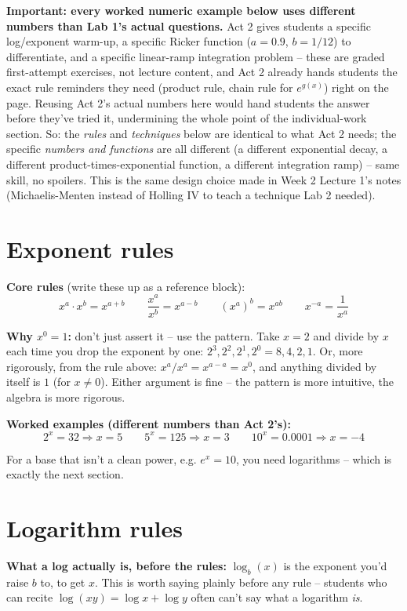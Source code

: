 \documentclass[12pt,]{article}
\begin{document}
\textbf{Important: every worked numeric example below uses different
numbers than Lab 1's actual questions.} Act 2 gives students a specific
log/exponent warm-up, a specific Ricker function (\(a=0.9\), \(b=1/12\))
to differentiate, and a specific linear-ramp integration problem --
these are graded first-attempt exercises, not lecture content, and Act 2
already hands students the exact rule reminders they need (product rule,
chain rule for \(e^{g(x)}\)) right on the page. Reusing Act 2's actual
numbers here would hand students the answer before they've tried it,
undermining the whole point of the individual-work section. So: the
\emph{rules} and \emph{techniques} below are identical to what Act 2
needs; the specific \emph{numbers and functions} are all different (a
different exponential decay, a different product-times-exponential
function, a different integration ramp) -- same skill, no spoilers. This
is the same design choice made in Week 2 Lecture 1's notes
(Michaelis-Menten instead of Holling IV to teach a technique Lab 2
needed).

\section{Exponent rules}\label{exponent-rules}

\textbf{Core rules} (write these up as a reference block):
\[x^a \cdot x^b = x^{a+b} \qquad \frac{x^a}{x^b}=x^{a-b} \qquad (x^a)^b = x^{ab} \qquad x^{-a}=\frac{1}{x^a}\]

\textbf{Why \(x^0=1\):} don't just assert it -- use the pattern. Take
\(x=2\) and divide by \(x\) each time you drop the exponent by one:
\(2^3, 2^2, 2^1, 2^0 = 8, 4, 2, 1\). Or, more rigorously, from the rule
above: \(x^a/x^a = x^{a-a}=x^0\), and anything divided by itself is
\(1\) (for \(x\neq0\)). Either argument is fine -- the pattern is more
intuitive, the algebra is more rigorous.

\textbf{Worked examples (different numbers than Act 2's):}
\[2^x=32 \Rightarrow x=5 \qquad 5^x=125 \Rightarrow x=3 \qquad 10^x=0.0001 \Rightarrow x=-4\]

For a base that isn't a clean power, e.g. \(e^x=10\), you need
logarithms -- which is exactly the next section.

\section{Logarithm rules}\label{logarithm-rules}

\textbf{What a log actually is, before the rules:} \(\log_b(x)\) is the
exponent you'd raise \(b\) to, to get \(x\). This is worth saying
plainly before any rule -- students who can recite
\(\log(xy)=\log x + \log y\) often can't say what a logarithm \emph{is}.
\end{document}

